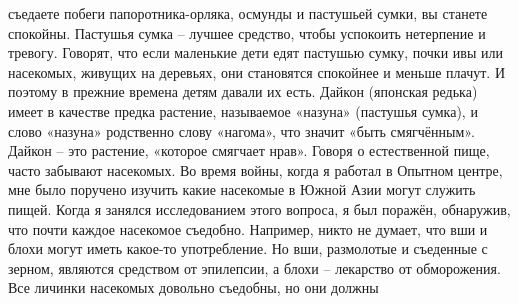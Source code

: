 \documentclass[a4paper]{book}
\begin{document}
съедаете побеги папоротника-орляка, осмунды и пастушьей сумки, вы станете спокойны.
Пастушья сумка – лучшее средство, чтобы успокоить нетерпение и тревогу. Говорят, что если
маленькие дети едят пастушью сумку, почки ивы или насекомых, живущих на деревьях, они
становятся спокойнее и меньше плачут. И поэтому в прежние времена детям давали их есть.
Дайкон (японская редька) имеет в качестве предка растение, называемое «назуна» (пастушья
сумка), и слово «назуна» родственно слову «нагома», что значит «быть смягчённым».
Дайкон – это растение, «которое смягчает нрав».
Говоря о естественной пище, часто забывают насекомых. Во время войны, когда я
работал в Опытном центре, мне было поручено изучить какие насекомые в Южной Азии
могут служить пищей. Когда я занялся исследованием этого вопроса, я был поражён,
обнаружив, что почти каждое насекомое съедобно.
Например, никто не думает, что вши и блохи могут иметь какое-то употребление. Но
вши, размолотые и съеденные с зерном, являются средством от эпилепсии, а блохи –
лекарство от обморожения. Все личинки насекомых довольно съедобны, но они должны
\end{document}
